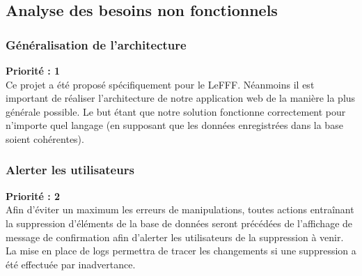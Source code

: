 \documentclass[12pt,a4paper]{article}
\begin{document}
\subsection{Analyse des besoins non fonctionnels}

\subsubsection{Généralisation de l'architecture}
\textbf{Priorité : 1} \\ 
Ce projet a été proposé spécifiquement pour le LeFFF. Néanmoins il est important de réaliser l'architecture de notre application web de la manière la plus générale possible.
Le but étant que notre solution fonctionne correctement pour n'importe quel langage (en supposant que les données enregistrées dans la base soient cohérentes).

\subsubsection{Alerter les utilisateurs} 
\textbf{Priorité : 2} \\ 
Afin d'éviter un maximum les erreurs de manipulations, toutes actions entraînant la suppression d'éléments de la base de données seront précédées de l'affichage de message de confirmation afin d'alerter les utilisateurs de la suppression à venir.
La mise en place de logs permettra de tracer les changements si une suppression a été effectuée par inadvertance.
\end{document}
